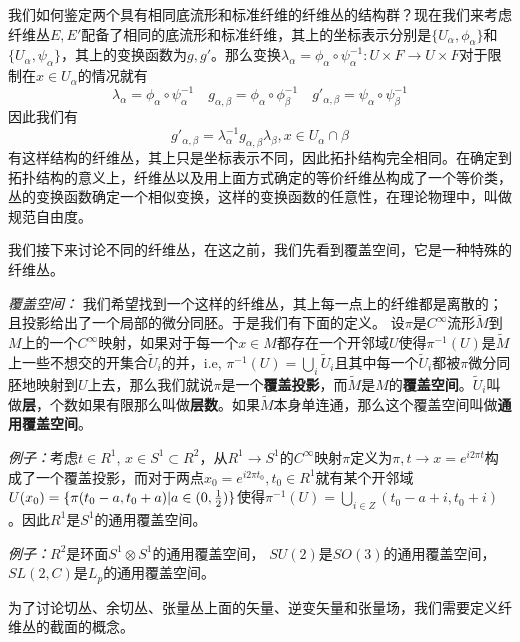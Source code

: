 \documentclass[supercite]{HustGraduPaper}
\begin{document}
\begin{appendices}
		我们如何鉴定两个具有相同底流形和标准纤维的纤维丛的结构群？现在我们来考虑纤维丛$E,E'$配备了相同的底流形和标准纤维，其上的坐标表示分别是$\{U_\alpha, \phi_\alpha\}$和$\{U_\alpha, \psi_\alpha\}$，其上的变换函数为$g,g'$。那么变换$\lambda_\alpha = \phi_\alpha \circ \psi^{-1}_\alpha: U\times F\to U \times F $对于限制在$x \in U_\alpha$的情况就有
		\begin{equation}
		\lambda_\alpha = \phi_\alpha \circ \psi^{-1}_\alpha \quad g_{\alpha,\beta} = \phi_{\alpha} \circ \phi_\beta^{-1} \quad g'_{\alpha,\beta} = \psi_{\alpha} \circ \psi_\beta^{-1}
		\end{equation}
		因此我们有
		\begin{equation}
		g'_{\alpha,\beta} = \lambda_\alpha^{-1} g_{\alpha,\beta} \lambda_{\beta}, x \in U_\alpha \cap \beta
		\end{equation}
		有这样结构的纤维丛，其上只是坐标表示不同，因此拓扑结构完全相同。在确定到拓扑结构的意义上，纤维丛以及用上面方式确定的等价纤维丛构成了一个等价类，丛的变换函数确定一个相似变换，这样的变换函数的任意性，在理论物理中，叫做规范自由度。
		
		我们接下来讨论不同的纤维丛，在这之前，我们先看到覆盖空间，它是一种特殊的纤维丛。
		
		\textit{覆盖空间：} 我们希望找到一个这样的纤维丛，其上每一点上的纤维都是离散的；且投影给出了一个局部的微分同胚。于是我们有下面的定义。 设$\pi$是$C^\infty$流形$\tilde{M}$到$M$上的一个$C^\infty$映射，如果对于每一个$x\in M$都存在一个开邻域$U$使得$\pi^{-1}(U)$是$\tilde{M}$上一些不想交的开集合$\tilde{U}_i$的并，i.e, $\pi^{-1}(U) = \bigcup_i \tilde{U}_i$且其中每一个$\tilde{U}_i$都被$\pi$微分同胚地映射到$U$上去，那么我们就说$\pi$是一个\textbf{覆盖投影}，而$\tilde{M}$是$M$的\textbf{覆盖空间}。$\tilde{U}_i$叫做\textbf{层}，个数如果有限那么叫做\textbf{层数}。如果$\tilde{M}$本身单连通，那么这个覆盖空间叫做\textbf{通用覆盖空间}。
		
		\textit{例子：}考虑$t \in R^1$, $x \in S^1 \subset R^2$，从$R^1 \to S^1$的$C^\infty$映射$\pi$定义为$\pi, t \to x= e^{i 2\pi t}$构成了一个覆盖投影，而对于两点$x_0 = e^{i 2\pi t_0}, t_0 \in R^1$就有某个开邻域$U(x_0) = \{\pi(t_0-a,t_0+a) | a \in (0,{1\over 2})\}$使得$\pi^{-1}(U) = \bigcup_{i \in Z}(t_0-a +i, t_0+i)$。因此$R^1$是$S^1$的通用覆盖空间。
		
		\textit{例子：}$R^2$是环面$S^1 \otimes S^1$的通用覆盖空间， $SU(2)$是$SO(3)$的通用覆盖空间，$SL(2,C)$是$L_p$的通用覆盖空间。
		
		为了讨论切丛、余切丛、张量丛上面的矢量、逆变矢量和张量场，我们需要定义纤维丛的截面的概念。
		

\end{appendices}
\end{document}
